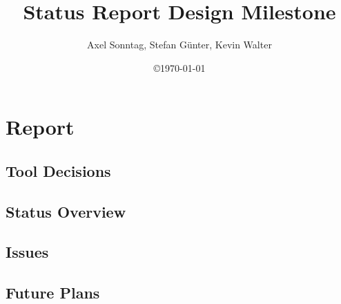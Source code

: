\documentclass[a4paper,12pt]{scrartcl}[1970/01/01]
\title{Status Report Design Milestone}
\author{Axel Sonntag, Stefan Günter, Kevin Walter}
\date{\copyright\space\today}
\begin{document}
\maketitle
\newpage

\tableofcontents
\newpage


\section{Report}
\subsection{Tool Decisions}


\subsection{Status Overview}


\subsection{Issues}


\subsection{Future Plans}

\end{document}
